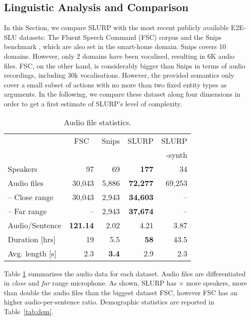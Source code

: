 \documentclass[11pt,a4paper]{article}
\newcommand{\datasetacr}{SLURP}
\newcommand{\etoe}{E2E}
\newcommand{\slu}{SLU}
\begin{document}
\subsection{Linguistic Analysis and Comparison}
\label{subsec:comparison}
In this Section, we compare \datasetacr{} with the most recent publicly available \etoe-\slu{} datasets: The Fluent Speech Command (FSC) corpus \cite{lugosh19:Interspeech} and the Snips benchmark \cite{Coucke18:Snips}, which are also set in the smart-home domain.
 Snips covers 10 domains. However, only 2 domains
have been vocalised, resulting in \texttildelow6K audio files. FSC, on the other hand, is considerably bigger than Snips in terms of audio recordings, including \texttildelow30k vocalisations. However, the provided semantics only cover a small subset of actions with no more than two fixed entity types as arguments.
In the following, we compare these dataset along 
four dimensions in order to get a first estimate of \datasetacr's level of complexity. 


\begin{table}[t]
    \centering
    \footnotesize
    \begin{tabular}{lrrrr}
\hline
         &    \multicolumn{1}{c}{FSC} &   \multicolumn{1}{c}{Snips} &    \multicolumn{1}{c}{\datasetacr} &   \multicolumn{1}{c}{\datasetacr}\\
         &    &    &   & -synth\\
\hline
 Speakers      &    97    &   69    &  {\bf 177}  &     34    \\
 Audio files         & 30,043    & 5,886    & \textbf{72,277}    &     69,253\\
 \; -- Close range &    30,043    &  2,943    & \textbf{34,603}    &      --\\
 \; -- Far range     &    --    &   2,943    & \textbf{37,674}    &     --\\
 Audio/Sentence  &   \textbf{121.14} &    2.02 &     4.21 &        3.87\\
 Duration [hrs] & 19 & 5.5 & \textbf{58} & 43.5  \\
 Avg. length [s] & 2.3 & \textbf{3.4} & 2.9 & 2.3 \\
\hline
\end{tabular}
    \caption{Audio file statistics.} \label{tab:audio}
\end{table}

 Table \ref{tab:audio} 
summarises 
the audio data for each dataset. Audio files are differentiated in \textit{close} and \textit{far} range microphone. As shown, \datasetacr{} has $\times$ more speakers, more than double the audio files than the biggest dataset FSC, however FSC has an higher
audio-per-sentence ratio. Demographic statistics are reported in Table~\ref{tab:dem}. 
\end{document}
